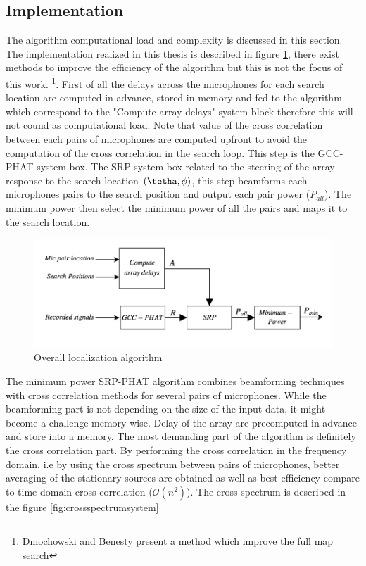\subsection{Implementation}

The algorithm computational load and complexity is discussed in this section. The implementation realized in this thesis is described in figure \ref{fig:systemimplementaiton}, there exist methods to improve the efficiency of the algorithm but this is not the focus of this work. \footnote{Dmochowski and Benesty \cite{dmochowski2007generalized} present a method which improve the full map search}. First of all the delays across the microphones for each search location are computed in advance, stored in memory and fed to the algorithm which correspond to the "Compute array delays" system block therefore this will not cound as computational load. Note that value of the cross correlation between each pairs of microphones are computed upfront to avoid the computation of the cross correlation in the search loop. This step is the GCC-PHAT system box. The SRP system box related to the steering of the array response to the search location $(\tetha,\phi)$, this step beamforms each microphones pairs to the search position and output each pair power ($P_{all}$). The minimum power then select the minimum power of all the pairs and maps it to the search location.

\begin{figure}[!ht]
    \centering
    \includegraphics[width=1\textwidth]{Figures/system1.png}
    \caption{Overall localization algorithm}
    \label{fig:systemimplementaiton}
\end{figure}

The minimum power SRP-PHAT algorithm combines beamforming techniques with cross correlation methods for several pairs of microphones. While the beamforming part is not depending on the size of the input data, it might become a challenge memory wise. Delay of the array are precomputed in advance and store into a memory. The most demanding part of the algorithm is definitely the cross correlation part. By performing the cross correlation in the frequency domain, i.e by using the cross spectrum between pairs of microphones, better averaging of the stationary sources are obtained as well as best efficiency compare to time domain  cross correlation ($\mathcal{O}(n^2)$). The cross spectrum is described in the figure \ref{fig:crossspectrumsystem} 

